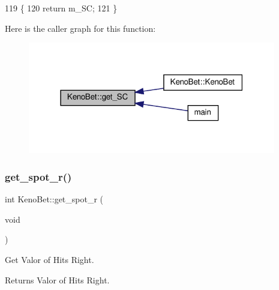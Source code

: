 \begin{DoxyCode}
119 \{
120     \textcolor{keywordflow}{return} m\_SC;
121 \}
\end{DoxyCode}
Here is the caller graph for this function\+:
\nopagebreak
\begin{figure}[H]
\begin{center}
\leavevmode
\includegraphics[width=307pt]{classKenoBet_a0c2ee88fc2f8e7afc5b0399fe74c022b_icgraph}
\end{center}
\end{figure}
\mbox{\label{classKenoBet_a79f26e472d9a60894e25094a37d06eb6}} 
\subsubsection{\texorpdfstring{get\+\_\+spot\+\_\+r()}{get\_spot\_r()}}
{\footnotesize\ttfamily int Keno\+Bet\+::get\+\_\+spot\+\_\+r (\begin{DoxyParamCaption}\item[{void}]{ }\end{DoxyParamCaption})}



Get Valor of Hits Right. 

\begin{DoxyReturn}{Returns}
Valor of Hits Right. 
\end{DoxyReturn}

